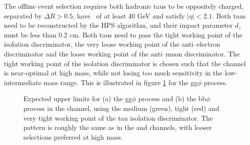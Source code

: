 The offline event selection requires both hadronic taus to be oppositely charged, separated
by $\Delta R > 0.5$, have \pT~of at least 40 GeV and satisfy $|\eta|<2.1$. Both taus need
to be reconstructed by the HPS algorithm, and their impact parameter $d_{z}$ must be less than 0.2 cm.
Both taus need to pass the tight working point of the isolation discriminator, the very loose 
working point of the anti--electron discriminator and the loose working point of the anti--muon discriminator. 
The tight working point of the isolation discriminator is chosen such that
the channel is near-optimal at high mass, while not losing too much sensitivity in the low-intermediate mass range.
This is illustrated in figure \ref{fig:mssm_tauid_tt} for the gg$\phi$ process.

\begin{figure}[h!]
\begin{center}
\end{center}
\caption[Expected upper limits for the gg$\phi$ and bb$\phi$ process
in the \tautau channel, comparing different hadronic tau isolation working
points.]{Expected upper limits for (a) the gg$\phi$ process and (b) the bb$\phi$ process 
in the \tautau channel, using the 
medium (green), tight (red) and very tight working point of the tau isolation discriminator.
The pattern is roughly the same as in the \etau and \mutau channels, with looser selections preferred at high
mass.}
\label{fig:mssm_tauid_tt}
\end{figure}

